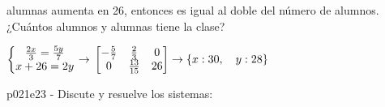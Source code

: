\documentclass[spanish, 11pt]{exam}
\begin{document}
\begin{questions}
\begin{multicols}{1}
\begin{parts}
alumnas aumenta en 26, entonces es igual al doble del número de alumnos. ¿Cuántos alumnos y alumnas
tiene la clase?  \begin{solution}  $ \left\{\begin{matrix}\frac{2x}{3}=\frac{5y}{7}\\ x+26=2y\\ \end{matrix}\right.  \rightarrow  \\\left[\begin{matrix}- \frac{5}{7} & \frac{2}{3} & 0\\0 & \frac{13}{15} & 26\end{matrix}\right] \rightarrow  \left \{ x : 30, \quad y : 28\right \} $  \end{solution}
        \end{parts}
        \end{multicols}
        \question p021e23 - Discute y resuelve los sistemas:
        \begin{multicols}{2} 

\end{multicols}
\end{questions}
\end{document}
